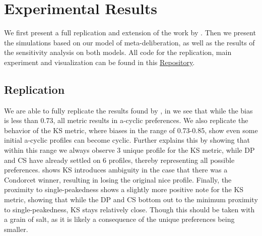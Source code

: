 \newpage
\chapter{Experimental Results}
\label{experiment_results}
We first present a full replication and extension of the work by \citet{radDeliberationSinglePeakednessCoherent2021}. Then we present the simulations based on our model of meta-deliberation, as well as the results of the sensitivity analysis on both models. All code for the replication, main experiment and visualization can be found in this \href{https://github.com/amirsahrani/master_thesis}{Repository}.


\section{Replication}
We are able to fully replicate the results found by \citet{radDeliberationSinglePeakednessCoherent2021},  in  we see that while the bias is less than 0.73, all metric results in a-cyclic preferences. We also replicate the behavior of the KS metric, where biases in the range of 0.73-0.85, show even some initial a-cyclic profiles can become cyclic.  Further explains this by showing that within this range we always observe 3 unique profile for the KS metric, while DP and CS have already settled on 6 profiles, thereby representing all possible preferences.  shows KS introduces ambiguity in the case that there was a Condorcet winner, resulting in losing the original nice profile. Finally, the proximity to single-peakedness shows a slightly more positive note for the KS metric, showing that while the DP and CS bottom out to the minimum proximity to single-peakedness, KS stays relatively close. Though this should be taken with a grain of salt, as it is likely a consequence of the unique preferences being smaller.

